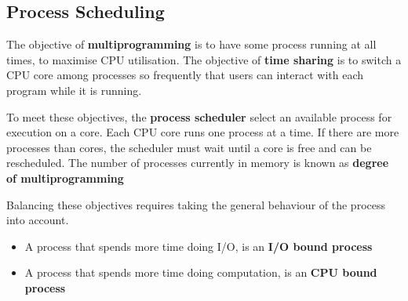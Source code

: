 \documentclass{article}
\begin{document}
\subsection{Process Scheduling}
The objective of \textbf{multiprogramming} is to have some process
running at all times, to maximise CPU utilisation. The objective of
\textbf{time sharing} is to switch a CPU core among processes so
frequently that users can interact with each program while it is
running.

To meet these objectives, the \textbf{process scheduler} select an
available process for execution on a core. Each CPU core runs one
process at a time. If there are more processes than cores, the
scheduler must wait until a core is free and can be rescheduled. The
number of processes currently in memory is known as \textbf{degree of
multiprogramming}

Balancing these objectives requires taking the general behaviour of the
process into account.
\begin{itemize}
    \item A process that spends more time doing I/O, is an \textbf{I/O
          bound process}
    \item A process that spends more time doing computation, is an
          \textbf{CPU bound process}
\end{itemize}
\end{document}
